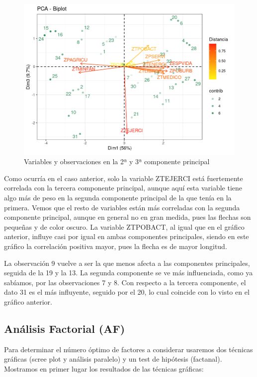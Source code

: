 \documentclass[11pt,a4paper]{article}
\begin{document}
         \begin{figure}[H]
    	    \centering
    	    \includegraphics[scale=0.5]{pca5.png}
    	    \caption{Variables y observaciones en la 2ª y 3ª componente principal}
    	    \label{pca6}
    	\end{figure}
    	
    	Como ocurría en el caso anterior, solo la variable ZTEJERCI está fuertemente correlada con la tercera componente principal, aunque aquí esta variable tiene algo más de peso en la segunda componente principal de la que tenía en la primera. Vemos que el resto de variables están más correladas con la segunda componente principal, aunque en general no en gran medida, pues las flechas son pequeñas y de color oscuro. La variable ZTPOBACT, al igual que en el gráfico anterior, influye casi por igual en ambas componentes principales, siendo en este gráfico la correlación positiva mayor, pues la flecha es de mayor longitud.
    	
    	La observación 9 vuelve a ser la que menos afecta a las componentes principales, seguida de la 19 y la 13. La segunda componente se ve más influenciada, como ya sabíamos, por las observaciones 7 y 8. Con respecto a la tercera componente, el dato 31 es el más influyente, seguido por el 20, lo cual coincide con lo visto en el gráfico anterior.
     
    \subsection{Análisis Factorial (AF)}
    
    Para determinar el número óptimo de factores a considerar usaremos dos técnicas gráficas (scree plot y análisis paralelo) y un test de hipótesis (factanal). Mostramos en primer lugar los resultados de las técnicas gráficas:
    
\end{document}

